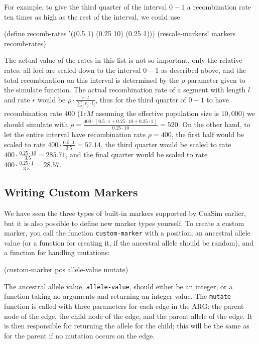 \documentclass{manual}
\begin{document}
For example, to give the third quarter of the interval $0-1$ a
recombination rate ten times as high as the rest of the interval, we
could use
\begin{code}
(define recomb-rates '((0.5 1) (0.25 10) (0.25 1)))
(rescale-markers! markers recomb-rates)
\end{code}

The actual value of the rates in this list is not so important, only
the relative rates: all loci are scaled down to the interval $0-1$ as
described above, and the total recombination on this interval is
determined by the $\rho$ parameter given to the simulate function.
The actual recombination rate of a segment with length $l$ and rate
$r$ would be $\rho\cdot\frac{r\cdot{}l}{\sum_jr_j\cdot{}l_j}$, thus
for the third quarter of $0-1$ to have recombination rate $400$ ($1cM$
assuming the effective population size is $10,000$) we should simulate
with $\rho=\frac{400\cdot{}(0.5\cdot{}1+0.25\cdot{}10+0.25\cdot{}1)}
                {0.25\cdot{}10}=
520$.  On the other hand, to let the entire interval have
recombination rate $\rho=400$, the first half would be scaled to rate
$400\cdot{}\frac{0.5\cdot{}1}{3.5}=57.14$, the third quarter would be
scaled to rate $400\cdot{}\frac{0.25\cdot{}10}{3.5}=285.71$, and the
final quarter would be scaled to rate
$400\cdot{}\frac{0.25\cdot{}1}{3.5}=28.57$.


\subsection{Writing Custom Markers}
\label{sec:writ-cust-mark}

We have seen the three types of built-in markers supported by CoaSim
earlier, but it is also possible to define new marker types yourself.
To create a custom marker, you call the function
\texttt{custom-marker} with a position, an ancestral allele value (or
a function for creating it, if the ancestral allele should be random),
and a function for handling mutations:
\begin{code}
(custom-marker pos allele-value mutate)
\end{code}
The ancestral allele value, \texttt{allele-value}, should either be an
integer, or a function taking no arguments and returning an integer
value.  The \texttt{mutate} function is called with three parameters
for each edge in the ARG: the parent node of the edge, the child node
of the edge, and the parent allele of the edge.  It is then responsible
for returning the allele for the child; this will be the same as for
the parent if no mutation occurs on the edge.
\end{document}
